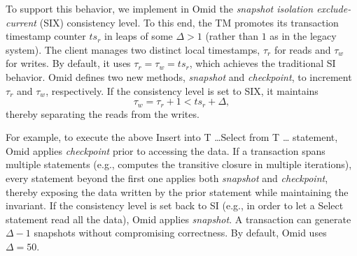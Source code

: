 To support this behavior, we implement in Omid the  {\em snapshot isolation exclude-current} (SIX) 
consistency level. To this end, the TM promotes its transaction timestamp counter $ts_r$ 
in leaps of some $\Delta > 1$ (rather than $1$ as in the legacy system).  The client manages 
two distinct local timestamps, $\tau_r$ for reads and $\tau_w$ for writes. By default, 
it uses  $\tau_r = \tau_w = ts_r$, which achieves the traditional SI behavior. Omid 
defines two new methods, {\em snapshot\/} and {\em checkpoint}, to increment 
$\tau_r$ and $\tau_w$, respectively. If the consistency level is set to SIX, 
it maintains 
\[
\tau_w = \tau_r+1 < ts_r+\Delta,
\]
thereby separating the reads from the writes. 

For example, to execute  
the above {\sc Insert into T \ldots Select from T \ldots \/} statement, Omid applies 
{\em checkpoint\/} prior to accessing the data. If a transaction spans multiple 
statements (e.g., computes the transitive closure in multiple iterations), 
every statement beyond the first one applies both {\em snapshot\/} 
and {\em checkpoint}, thereby exposing the data written by the prior 
statement while maintaining the invariant. If the consistency level is
set back to SI (e.g., in order to let a {\sc Select\/} statement read all 
the data), Omid applies {\em snapshot\/}.  
A transaction can generate $\Delta-1$ snapshots without compromising
 correctness. By default, Omid uses $\Delta=50$.  

